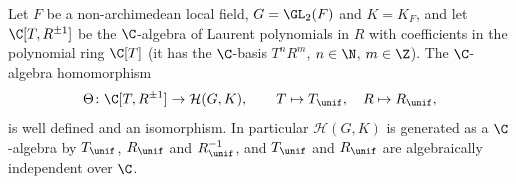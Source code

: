 Let $F$ be a non-archimedean local field, $G=\GL_2(F)$ and $K=K_F$, and let $\C[T,R^{\pm1}]$ be the $\C$-algebra of
Laurent polynomials in $R$ with coefficients in the polynomial ring $\C[T]$ (it has the $\C$-basis $T^nR^m$,
$n\in\N$, $m\in\Z$). The $\C$-algebra homomorphism
\[
  \Theta\colon\C[T,R^{\pm1}]\to\mathcal H(G,K),\qquad T\mapsto T_\unif,\quad R\mapsto R_\unif,
\]
is well defined and an isomorphism. In particular $\mathcal H(G,K)$ is generated as a $\C$-algebra by $T_\unif$,
$R_\unif$ and $R_\unif^{-1}$, and $T_\unif$ and $R_\unif$ are algebraically independent over $\C$.
